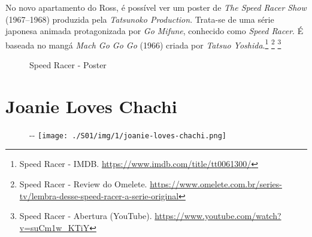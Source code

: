 \saveparinfos
\noindent
\begin{minipage}[c]{0.5\textwidth}\useparinfo

No novo apartamento do Ross, é possível ver um poster de \emph{The Speed
Racer Show} (1967--1968) produzida pela \emph{Tatsunoko Production}.
Trata-se de uma série japonesa animada protagonizada por \emph{Go
Mifune}, conhecido como \emph{Speed Racer}. É baseada no mangá
\emph{Mach Go Go Go} (1966) criada por \emph{Tatsuo Yoshida}.\footnote{\sloppy Speed Racer - IMDB. \url{https://www.imdb.com/title/tt0061300/}}
\footnote{\sloppy Speed Racer - Review do Omelete. \url{https://www.omelete.com.br/series-tv/lembra-desse-speed-racer-a-serie-original}}
\footnote{\sloppy Speed Racer - Abertura (YouTube). \url{https://www.youtube.com/watch?v=suCm1w_KTiY}}

\end{minipage}\hfill
\begin{minipage}[c]{0.5\textwidth}

\begin{figure}
  \centering
    \caption{Speed Racer - Poster\label{fig:speed-racer-poster}}
\end{figure}

\end{minipage}

\hypertarget{joanie-loves-chachi}{%
\section{Joanie Loves Chachi}\label{joanie-loves-chachi}}

\begin{figure}[!ht]
  \begin{adjustwidth}{-\oddsidemargin-1in}{-\rightmargin}
    \centering
    \texttt{[image: ./S01/img/1/joanie-loves-chachi.png]}
  \end{adjustwidth}
\end{figure}

